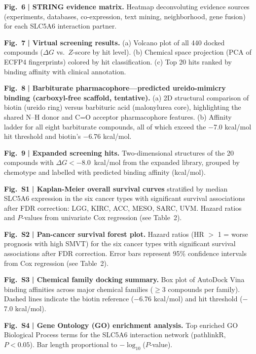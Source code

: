 \documentclass[10pt,letterpaper]{article}
\begin{document}
\noindent\textbf{Fig.~6} \textbf{| STRING evidence matrix.} Heatmap deconvoluting evidence sources (experiments, databases, co-expression, text mining, neighborhood, gene fusion) for each SLC5A6 interaction partner.

\noindent\textbf{Fig.~7} \textbf{| Virtual screening results.} (a) Volcano plot of all 440 docked compounds ($\Delta G$ vs.\ $Z$-score by hit level). (b) Chemical space projection (PCA of ECFP4 fingerprints) colored by hit classification. (c) Top 20 hits ranked by binding affinity with clinical annotation.

\noindent\textbf{Fig.~8} \textbf{| Barbiturate pharmacophore---predicted ureido-mimicry binding (carboxyl-free scaffold, tentative).} (a) 2D structural comparison of biotin (ureido ring) versus barbituric acid (malonylurea core), highlighting the shared N--H donor and C=O acceptor pharmacophore features. (b) Affinity ladder for all eight barbiturate compounds, all of which exceed the $-$7.0 kcal/mol hit threshold and biotin's $-$6.76 kcal/mol.

\noindent\textbf{Fig.~9} \textbf{| Expanded screening hits.} Two-dimensional structures of the 20 compounds with $\Delta G < -8.0$~kcal/mol from the expanded library, grouped by chemotype and labelled with predicted binding affinity (kcal/mol).

\noindent\textbf{Fig.~S1} \textbf{| Kaplan-Meier overall survival curves} stratified by median SLC5A6 expression in the six cancer types with significant survival associations after FDR correction: LGG, KIRC, ACC, MESO, SARC, UVM. Hazard ratios and $P$-values from univariate Cox regression (see Table~2).

\noindent\textbf{Fig.~S2} \textbf{| Pan-cancer survival forest plot.} Hazard ratios (HR $>$ 1 = worse prognosis with high SMVT) for the six cancer types with significant survival associations after FDR correction. Error bars represent 95\% confidence intervals from Cox regression (see Table~2).

\noindent\textbf{Fig.~S3} \textbf{| Chemical family docking summary.} Box plot of AutoDock Vina binding affinities across major chemical families ($\ge$3 compounds per family). Dashed lines indicate the biotin reference ($-$6.76 kcal/mol) and hit threshold ($-$7.0 kcal/mol).

\noindent\textbf{Fig.~S4} \textbf{| Gene Ontology (GO) enrichment analysis.} Top enriched GO Biological Process terms for the SLC5A6 interaction network (pathlinkR, $P < 0.05$). Bar length proportional to $-\log_{10}$($P$-value).
\end{document}
